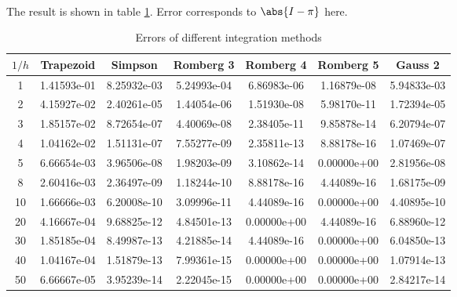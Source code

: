 \documentclass[english, nochinese]{../textmpls/pkupaper}
\begin{document}
\begin{thmquestion}
\ 
\begin{thmanswer}
The result is shown in table \ref{Tbl:Res}. Error corresponds to $ \abs{ I - \pi } $ here.

\begin{table}[htbp]
\centering
\caption{Errors of different integration methods}
\label{Tbl:Res}
\begin{tabular}{|c|c|c|c|c|c|c|}
\hline
$ 1 / h $ & Trapezoid & Simpson & Romberg 3 & Romberg 4 & Romberg 5 & Gauss 2 \\
\hline
1 & 1.41593e-01 & 8.25932e-03 & 5.24993e-04 & 6.86983e-06 & 1.16879e-08 & 5.94833e-03 \\
\hline
2 & 4.15927e-02 & 2.40261e-05 & 1.44054e-06 & 1.51930e-08 & 5.98170e-11 & 1.72394e-05 \\
\hline
3 & 1.85157e-02 & 8.72654e-07 & 4.40069e-08 & 2.38405e-11 & 9.85878e-14 & 6.20794e-07 \\
\hline
4 & 1.04162e-02 & 1.51131e-07 & 7.55277e-09 & 2.35811e-13 & 8.88178e-16 & 1.07469e-07 \\
\hline
5 & 6.66654e-03 & 3.96506e-08 & 1.98203e-09 & 3.10862e-14 & 0.00000e+00 & 2.81956e-08 \\
\hline
8 & 2.60416e-03 & 2.36497e-09 & 1.18244e-10 & 8.88178e-16 & 4.44089e-16 & 1.68175e-09 \\
\hline
10 & 1.66666e-03 & 6.20008e-10 & 3.09996e-11 & 4.44089e-16 & 0.00000e+00 & 4.40895e-10 \\
\hline
20 & 4.16667e-04 & 9.68825e-12 & 4.84501e-13 & 0.00000e+00 & 4.44089e-16 & 6.88960e-12 \\
\hline
30 & 1.85185e-04 & 8.49987e-13 & 4.21885e-14 & 4.44089e-16 & 0.00000e+00 & 6.04850e-13 \\
\hline
40 & 1.04167e-04 & 1.51879e-13 & 7.99361e-15 & 0.00000e+00 & 0.00000e+00 & 1.07914e-13 \\
\hline
50 & 6.66667e-05 & 3.95239e-14 & 2.22045e-15 & 0.00000e+00 & 0.00000e+00 & 2.84217e-14 \\
\hline
\end{tabular}
\end{table}
\end{thmanswer}
\end{thmquestion}
\end{document}
